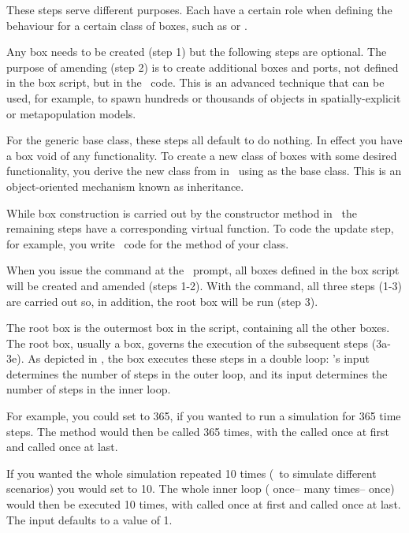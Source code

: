 These steps serve different  purposes. Each have a certain role when  defining the behaviour for a certain class of boxes, such as  or . 

Any box needs to be created (step 1) but the following steps are optional. The purpose of amending (step 2) is to create additional boxes and ports, not defined in the box script, but in the \CPP\ code. This is an advanced technique that can be used, for example, to spawn hundreds or thousands of  objects in spatially-explicit or metapopulation models.

For the generic  base class, these steps all default to do nothing. In effect you have a box void of any functionality. To create a new class of boxes with some desired functionality, you derive the new class from  in \CPP\ using  as the base class. This is an object-oriented mechanism known as  inheritance.

While box construction is carried out by the constructor method in \CPP\, the remaining steps have a corresponding virtual function. To code the update step, for example, you write \CPP\ code for the  method of your class.

When you issue the  command at the \US\ prompt, all boxes defined in the box script will be created and amended (steps 1-2). With the  command, all three steps (1-3) are carried out so, in addition, the root box will be run (step 3). 

The root box is the outermost box in the script, containing all the other boxes. The root box, usually a  box, governs the execution of the subsequent steps (3a-3e). As depicted in , the  box executes these steps in a double loop: 's  input determines the number of steps in the outer loop, and its  input determines the number of steps in the inner loop.

For example, you could set  to 365, if you wanted to run a simulation for 365 time steps. The  method would then be called 365 times, with the  called once at first and  called once at last.

If you wanted the whole simulation repeated 10 times (\eg\ to simulate different scenarios)  you would set  to 10. The whole inner loop ( once-- many times-- once) would then be executed 10 times, with  called once at first and  called once at last. The  input defaults to a value of 1. 

